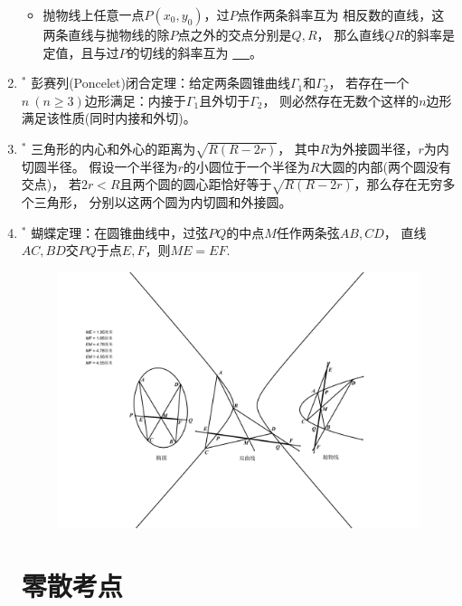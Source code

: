 \documentclass{article}
\newif\ifte
\renewcommand\geq\geqslant
\begin{document}
\begin{multicols}{2}
\begin{enumerate}[leftmargin=20pt]
\begin{itemize}[leftmargin=-4pt]
\item 抛物线上任意一点$ P(x_0,y_0) $，过$ P $点作两条斜率互为
相反数的直线，这两条直线与抛物线的除$ P $点之外的交点分别是$ Q,R $，
那么直线$ QR $的斜率是定值，且与过$ P $的切线的斜率互为
\underline{\ \ifte 相反数\else \hspace{2cm} \fi\ }。


\end{itemize}

\item $^*$ 彭赛列(Poncelet)闭合定理：给定两条圆锥曲线$ \Gamma_1 $和$ \Gamma_2 $，
若存在一个$ n\ (n\geq 3) $边形满足：内接于$ \Gamma_1 $且外切于$ \Gamma_2 $，
则必然存在无数个这样的$ n $边形满足该性质(同时内接和外切)。

\item $^*$ 三角形的内心和外心的距离为$ \sqrt{R(R-2r)} $，
其中$ R $为外接圆半径，$ r $为内切圆半径。
假设一个半径为$ r $的小圆位于一个半径为$ R $大圆的内部(两个圆没有交点)，
若$ 2r<R $且两个圆的圆心距恰好等于$ \sqrt{R(R-2r)} $，那么存在无穷多个三角形，
分别以这两个圆为内切圆和外接圆。

\item $^*$ 蝴蝶定理：在圆锥曲线中，过弦$ PQ $的中点$ M $任作两条弦$ AB,CD $，
直线$ AC,BD $交$ PQ $于点$ E,F $，则$ ME=EF $.
\begin{figure}[H]
    \centering
    \includegraphics[width=0.95\linewidth]{蝴蝶定理}
\end{figure}


\section{零散考点}


\end{enumerate}
\end{multicols}
\end{document}

